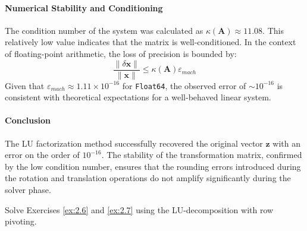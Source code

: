 \begin{solution}
	\paragraph{Numerical Stability and Conditioning}
	The condition number of the system was calculated as $\kappa(\mathbf{A})
		\approx 11.08$. This relatively low value indicates that the matrix is
	well-conditioned. In the context of floating-point arithmetic, the loss of
	precision is bounded by:
	\[
		\frac{\|\delta \mathbf{x}\|}{\|\mathbf{x}\|} \le \kappa(\mathbf{A})
		\varepsilon_{mach}
	\]
	Given that $\varepsilon_{mach} \approx 1.11 \times 10^{-16}$ for
	\texttt{Float64}, the observed error of $\sim 10^{-16}$ is consistent with
	theoretical expectations for a well-behaved linear system.

	\paragraph{Conclusion}
	The LU factorization method successfully recovered the original vector
	$\mathbf{z}$ with an error on the order of $10^{-16}$. The stability of the
	transformation matrix, confirmed by the low condition number, ensures that the
	rounding errors introduced during the rotation and translation operations do not
	amplify significantly during the solver phase.
\end{solution}

\begin{exercise}
	Solve Exercises \ref{ex:2.6} and \ref{ex:2.7} using the LU-decomposition
	with row pivoting.
\end{exercise}

